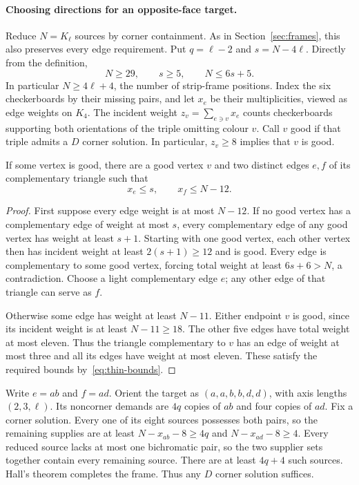 \paragraph{Choosing directions for an opposite-face target.}
Reduce $N=K_\ell$ sources by corner containment. As in
Section~\ref{sec:frames}, this also preserves every edge requirement.
Put $q=\ell-2$ and $s=N-4\ell$. Directly from the definition,
\begin{equation}\label{eq:thin-bounds}
 N\ge29,\qquad s\ge5,\qquad N\le6s+5.
\end{equation}
In particular $N\ge4\ell+4$, the number of strip-frame positions.
Index the six checkerboards by their missing pairs, and let $x_e$ be their
multiplicities, viewed as edge weights on $K_4$. The incident weight
$z_v=\sum_{e\ni v}x_e$ counts checkerboards supporting both orientations
of the triple omitting colour $v$. Call $v$ good if that triple admits a
$D$ corner solution. In particular, $z_v\ge8$ implies that $v$ is good.

\begin{lemma}\label{lem:thin-pairs}
If some vertex is good, there are a good vertex $v$ and two distinct edges
$e,f$ of its complementary triangle such that
\[
 x_e\le s,\qquad x_f\le N-12.
\]
\end{lemma}
\begin{proof}
First suppose every edge weight is at most $N-12$. If no good vertex has a
complementary edge of weight at most $s$, every complementary edge of any
good vertex has weight at least $s+1$. Starting with one good vertex, each
other vertex then has incident weight at least $2(s+1)\ge12$ and is good.
Every edge is complementary to some good vertex, forcing total weight at
least $6s+6>N$, a contradiction. Choose a light complementary edge $e$;
any other edge of that triangle can serve as $f$.

Otherwise some edge has weight at least $N-11$. Either endpoint $v$ is good,
since its incident weight is at least $N-11\ge18$. The other five edges
have total weight at most eleven. Thus the triangle complementary to $v$
has an edge of weight at most three and all its edges have weight at most
eleven. These satisfy the required bounds by~\eqref{eq:thin-bounds}.
\end{proof}

Write $e=ab$ and $f=ad$. Orient the target as $(a,a,b,b,d,d)$,
with axis lengths $(2,3,\ell)$. Its noncorner demands
are $4q$ copies of $ab$ and four copies of $ad$. Fix a corner solution.
Every one of its eight sources possesses both pairs, so the remaining
supplies are at least $N-x_{ab}-8\ge4q$ and
$N-x_{ad}-8\ge4$. Every reduced source lacks at most one bichromatic pair,
so the two supplier sets together contain every remaining source.
There are at least $4q+4$ such sources. Hall's theorem completes the frame.
Thus any $D$ corner solution suffices.

